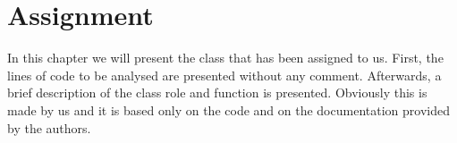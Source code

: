 \documentclass[\mainpath/main]{subfiles}
\begin{document}
\chapter{Assignment} %
\label{Assignment}

\setmyfancystyle

In this chapter we will present the class that has been assigned to us. First, the lines of code to be analysed are presented without any comment. Afterwards, a brief description of the class role and function is presented. Obviously this is made by us and it is based only on the code and on the documentation provided by the authors. 

\end{document}
